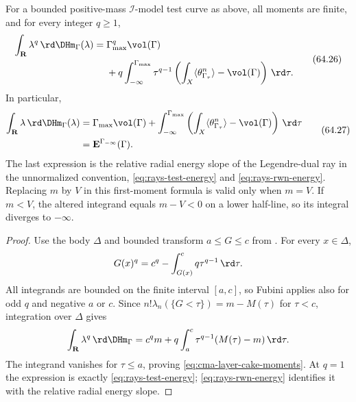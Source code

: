 \begin{theorem}\label{thm:cma-test-curve-moments}
For a bounded positive-mass $\mathcal I$-model test curve as above, all
moments are finite, and for every integer $q\geq1$,
\[
\begin{split}
    \int_{\mathbf R}\lambda^q\,\rd \DHm_\Gamma(\lambda)
   ={}&\Gamma_{\max}^q\vol(\Gamma)\\
   &+q\int_{-\infty}^{\Gamma_{\max}}
     \tau^{q-1}
     \left(\int_X\langle\theta_{\Gamma_\tau}^n\rangle
             -\vol(\Gamma)\right)\,\rd\tau.
\end{split}
\tag{64.26}\label{eq:cma-layer-cake-moments}
\]
In particular,
\[
 \begin{split}
 \int_{\mathbf R}\lambda\,\rd \DHm_\Gamma(\lambda)
 ={}&\Gamma_{\max}\vol(\Gamma)+
   \int_{-\infty}^{\Gamma_{\max}}
   \left(\int_X\langle\theta_{\Gamma_\tau}^n\rangle-\vol(\Gamma)\right)
   \,\rd\tau\\
 ={}&\mathbf E^{\Gamma_{-\infty}}(\Gamma).
 \end{split}
\tag{64.27}\label{eq:cma-first-moment}
\]
The last expression is the relative radial energy slope of the
Legendre-dual ray in the unnormalized convention,
\eqref{eq:rays-test-energy} and \eqref{eq:rays-rwn-energy}.
Replacing $m$ by $V$ in this first-moment formula is valid only when
$m=V$. If $m<V$, the altered integrand equals $m-V<0$ on a lower
half-line, so its integral diverges to $-\infty$.
\end{theorem}

\begin{proof}
Use the body $\Delta$ and bounded transform $a\leq G\leq c$ from
. For every $x\in\Delta$,
\[
 G(x)^q=c^q-\int_{G(x)}^c q\tau^{q-1}\,\rd\tau.
\]
All integrands are bounded on the finite interval $[a,c]$, so Fubini
applies also for odd $q$ and negative $a$ or $c$. Since
$n!\lambda_n(\{G<\tau\})=m-M(\tau)$ for $\tau<c$, integration over
$\Delta$ gives
\[
 \int_{\mathbf R}\lambda^q\,\rd\DHm_\Gamma
 =c^qm+q\int_a^c\tau^{q-1}(M(\tau)-m)\,\rd\tau.
\]
The integrand vanishes for $\tau\leq a$, proving
\eqref{eq:cma-layer-cake-moments}. At $q=1$ the expression is exactly
\eqref{eq:rays-test-energy}; \eqref{eq:rays-rwn-energy} identifies it
with the relative radial energy slope.
\end{proof}

